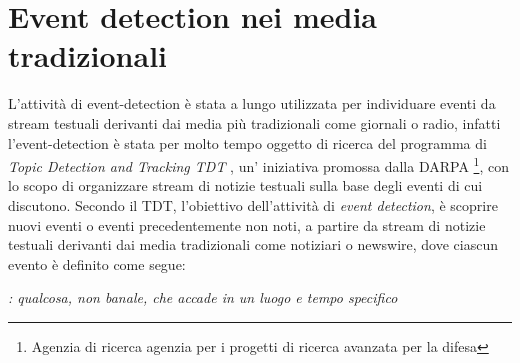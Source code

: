 


\section{Event detection nei media tradizionali}
L'attività di event-detection è stata a lungo utilizzata per individuare eventi da stream testuali derivanti dai media più tradizionali come giornali o radio, infatti l'event-detection è stata per molto tempo oggetto di ricerca del programma di \emph{Topic Detection and Tracking TDT} \cite{Allan:2002:TDT:772260}, un' iniziativa	promossa dalla DARPA \footnote{Agenzia di ricerca agenzia per i progetti di ricerca avanzata per la difesa}, con lo scopo di organizzare stream di notizie testuali sulla base degli eventi di cui discutono. Secondo il TDT, l'obiettivo dell'attività di \emph{event detection}, è scoprire nuovi  eventi o eventi precedentemente non noti, a partire da stream di notizie testuali derivanti dai media tradizionali come notiziari o newswire, dove ciascun evento è definito come segue:


\begin{definizione}[Evento]
\label{def:evento}
\emph{: qualcosa, non banale, che accade in un luogo e tempo specifico}
\end{definizione}


